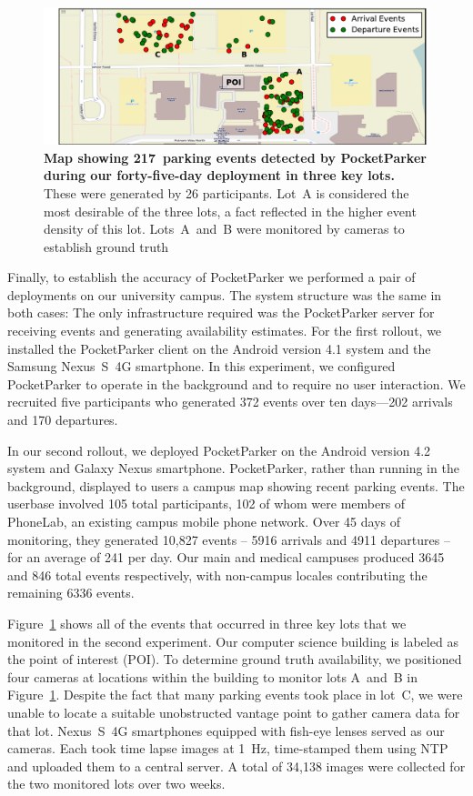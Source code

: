 \begin{figure}
\centering
\includegraphics[width=\textwidth]{./figures/EventsOnThreeParkingLot.pdf}

\caption{\textbf{Map showing 217~parking events detected by PocketParker
during our forty-five-day deployment in three key lots.}  These were
generated by 26 participants.  Lot~A is considered the most desirable of the
three lots, a fact reflected in the higher event density of this lot.  
Lots~A~and~B were monitored by cameras to establish ground truth}

\label{fig-events}
\end{figure}

Finally, to establish the accuracy of PocketParker we performed a pair of
deployments on our university campus.  The system structure was the same in
both cases:  The only infrastructure required was the PocketParker server for
receiving events and generating availability estimates.  For the first
rollout, we installed the PocketParker client on the Android version 4.1
system and the Samsung Nexus~S~4G smartphone.  In this experiment, we
configured PocketParker to operate in the background and to require no user
interaction.   We recruited five participants who generated 372 events over
ten days---202 arrivals and 170 departures.

In our second rollout, we deployed PocketParker on the Android version 4.2
system and Galaxy Nexus smartphone.  PocketParker, rather than running in the
background, displayed to users a campus map showing recent parking events.
The userbase involved 105 total participants, 102 of whom were members of
PhoneLab, an existing campus mobile phone network.  Over 45 days of 
monitoring, they generated 10,827 events -- 5916 arrivals and 4911 
departures -- for an average of 241 per day.  Our main and medical 
campuses produced 3645 and 846 total events respectively, with non-campus 
locales contributing the remaining 6336 events.

Figure~\ref{fig-events} shows all of the events that occurred in three key
lots that we monitored in the second experiment. Our computer science
building is labeled as the point of interest (POI). To determine ground
truth availability, we positioned four cameras at locations within the
building to monitor lots A~and~B in Figure~\ref{fig-events}.  Despite the fact
that many parking events took place in lot~C, we were unable to locate a
suitable unobstructed vantage point to gather camera data for that lot.
Nexus~S~4G smartphones equipped with fish-eye lenses served as our cameras.
Each took time lapse images at 1~Hz, time-stamped them using NTP and uploaded
them to a central server. A total of 34,138 images were collected for the two 
monitored lots over two weeks.

